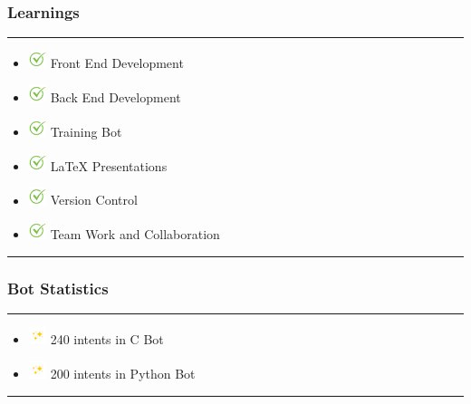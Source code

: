 \documentclass[14pt]{beamer}
\begin{document}
\begin{frame}
    \frametitle{Learnings}
    \noindent
    {\color{pink} \rule{\linewidth}{0.7mm} }
    \begin{itemize}
    \item [] \includegraphics[width=0.2in, height=0.2in]{./logos/check.png} Front End Development \\
        \pause
    \item [] \includegraphics[width=0.2in, height=0.2in]{./logos/check.png} Back End Development \\
        \pause
    \item [] \includegraphics[width=0.2in, height=0.2in]{./logos/check.png} Training Bot \\
        \pause
   \item [] \includegraphics[width=0.2in, height=0.2in]{./logos/check.png} LaTeX Presentations \\
       \pause
   \item [] \includegraphics[width=0.2in, height=0.2in]{./logos/check.png} Version Control \\
       \pause
   \item [] \includegraphics[width=0.2in, height=0.2in]{./logos/check.png} Team Work and Collaboration\\
\end{itemize}
\noindent
    {\color{pink} \rule{\linewidth}{0.7mm} }
\end{frame}


\begin{frame}
    \frametitle{Bot Statistics}
    \noindent
    {\color{pink} \rule{\linewidth}{0.7mm} }
	\begin{itemize} 
         \item [] \includegraphics[width=0.2in, height=0.2in]{./logos/sparkle.jpg} 240 intents in C Bot\\
             \pause
         \item [] \includegraphics[width=0.2in, height=0.2in]{./logos/sparkle.jpg} 200 intents in Python Bot\\
    \end{itemize}
    \noindent
    {\color{pink} \rule{\linewidth}{0.7mm} }
\end{frame}
\end{document}
